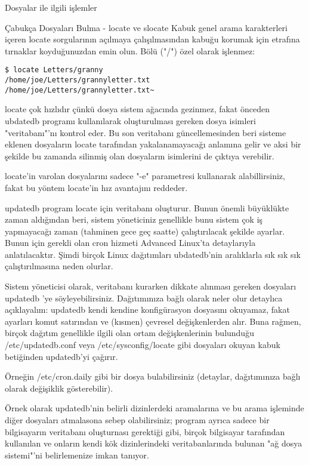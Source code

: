 \begin{section}{Dosyalar ile ilgili işlemler}
\begin{subsection}{Çabukça Dosyaları Bulma - locate ve slocate}
Kabuk genel arama karakterleri içeren locate sorgularının açılmaya çalışılmasından kabuğu korumak için etrafına tırnaklar koyduğunuzdan emin olun.
Bölü ("/") özel olarak işlenmez:
\begin{verbatim}
$ locate Letters/granny
/home/joe/Letters/grannyletter.txt
/home/joe/Letters/grannyletter.txt~
\end{verbatim}

locate çok hızlıdır çünkü dosya sistem ağacında gezinmez, fakat önceden ubdatedb programı kullanılarak oluşturulması gereken dosya isimleri "veritabanı"'nı kontrol eder. Bu son veritabanı güncellemesinden beri sisteme eklenen dosyaların locate tarafından yakalanamayacağı anlamına gelir ve aksi bir şekilde bu zamanda silinmiş olan dosyaların isimlerini de çıktıya verebilir.

locate'in varolan dosyalarını sadece "-e" parametresi kullanarak alabillirsiniz, fakat bu yöntem locate'in hız avantajını reddeder.

updatedb program locate için veritabanı oluşturur. Bunun önemli büyüklükte zaman aldığından beri, sistem yöneticiniz genellikle bunu sistem çok iş yapmayacağı zaman (tahminen gece geç saatte) çalıştırılacak şekilde ayarlar. Bunun için gerekli olan cron hizmeti Advanced Linux'ta detaylarıyla anlatılacaktır. Şimdi birçok Linux dağıtımları ubdatedb'nin aralıklarla sık sık sık çalıştırılmasına neden olurlar.

Sistem yöneticisi olarak, veritabanı kurarken dikkate alınması gereken dosyaları updatedb 'ye söyleyebilirsiniz. Dağıtımınıza bağlı olarak neler olur detaylıca açıklayalım: updatedb kendi kendine konfigürasyon dosyasını okuyamaz, fakat ayarları komut satırından ve (kısmen) çevresel değişkenlerden alır. Buna rağmen, birçok dağıtım genellikle ilgili olan ortam değişkenlerinin bulunduğu /etc/updatedb.conf veya /etc/sysconfig/locate gibi dosyaları okuyan kabuk betiğinden updatedb'yi çağırır.

Örneğin /etc/cron.daily gibi bir dosya bulabilirsiniz (detaylar, dağıtımınıza bağlı olarak değişiklik gösterebilir).
	
Örnek olarak updatedb'nin belirli dizinlerdeki aramalarına ve bu arama işleminde diğer dosyaları atmalasona sebep olabilirsiniz; program ayrıca sadece bir bilgisayarın veritabanı oluşturnası gerektiği gibi, birçok bilgisayar  tarafından kullanılan ve onların kendi kök dizinlerindeki veritabanlarında bulunan "ağ dosya sistemi"'ni belirlemenize imkan tanıyor.
	

\end{subsection}
\end{section}
